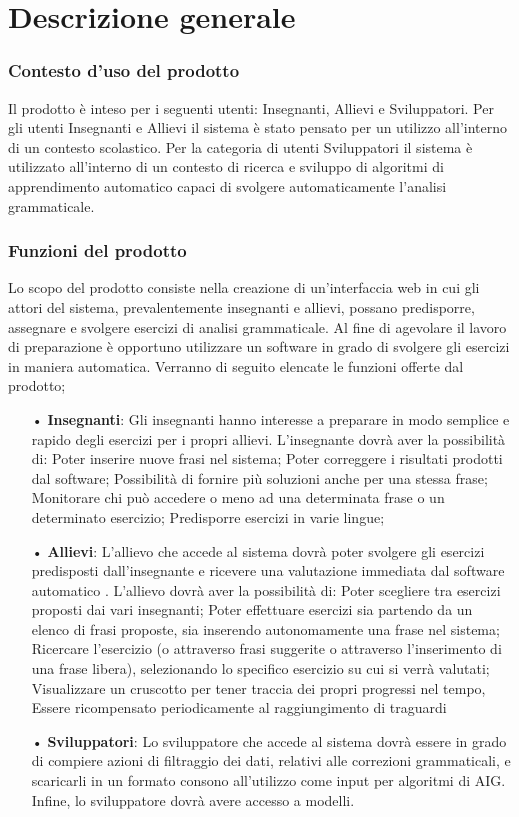 \section{Descrizione generale}
\subsubsection{Contesto d’uso del prodotto}
Il prodotto è inteso per i seguenti utenti: Insegnanti, Allievi e Sviluppatori.
Per gli utenti Insegnanti e Allievi il sistema è stato pensato per un utilizzo all’interno di un contesto scolastico. Per la categoria di utenti Sviluppatori il sistema è utilizzato all’interno di un contesto di ricerca e sviluppo di algoritmi di apprendimento automatico capaci di svolgere automaticamente l’analisi grammaticale. 
\subsubsection{Funzioni del prodotto}
Lo scopo del prodotto consiste nella creazione di un’interfaccia web in cui gli attori del sistema, prevalentemente insegnanti e allievi, possano predisporre, assegnare e svolgere esercizi di analisi grammaticale.
Al fine di agevolare il lavoro di preparazione è opportuno utilizzare un software in grado di svolgere gli esercizi in maniera automatica.
Verranno di seguito elencate le funzioni offerte dal prodotto;
\begin{itemize}
\item[•]\textbf{Insegnanti}:
Gli insegnanti hanno interesse a preparare in modo semplice e rapido degli esercizi per i propri allievi.
L’insegnante dovrà aver la possibilità di:
Poter inserire nuove frasi nel sistema;
Poter correggere i risultati prodotti dal software;
Possibilità di fornire più soluzioni anche per una stessa frase;
Monitorare chi può accedere o meno ad una determinata frase o un determinato esercizio;
Predisporre esercizi in varie lingue;

\item[•]\textbf{Allievi}:
L’allievo che accede al sistema dovrà poter svolgere gli esercizi predisposti dall’insegnante e ricevere una valutazione immediata dal software automatico .
L’allievo dovrà aver la possibilità di:
Poter scegliere tra esercizi proposti dai vari insegnanti;
Poter effettuare esercizi sia partendo da un elenco di frasi proposte, sia inserendo autonomamente una frase nel sistema;
Ricercare l’esercizio (o attraverso frasi suggerite o attraverso l’inserimento di una frase libera), selezionando lo specifico esercizio su cui si verrà valutati; 
Visualizzare un cruscotto per tener traccia dei propri progressi nel tempo,
Essere ricompensato periodicamente al raggiungimento di traguardi

\item[•]\textbf{Sviluppatori}:
Lo sviluppatore che accede al sistema dovrà essere in grado di compiere azioni di filtraggio dei dati, relativi alle correzioni grammaticali, e scaricarli in un formato consono all’utilizzo come input per algoritmi di AIG. 
Infine, lo sviluppatore dovrà avere accesso a modelli.
\end{itemize}
